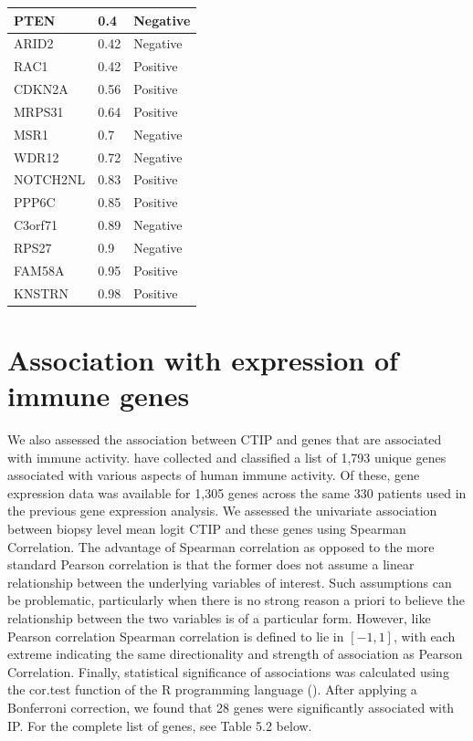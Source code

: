 \documentclass[
]{book}
\begin{document}
\begin{table}
\begin{tabular}[t]{l|l|l}
\hline
PTEN & 0.4 & Negative\\
\hline
ARID2 & 0.42 & Negative\\
\hline
RAC1 & 0.42 & Positive\\
\hline
CDKN2A & 0.56 & Positive\\
\hline
MRPS31 & 0.64 & Positive\\
\hline
MSR1 & 0.7 & Negative\\
\hline
WDR12 & 0.72 & Negative\\
\hline
NOTCH2NL & 0.83 & Positive\\
\hline
PPP6C & 0.85 & Positive\\
\hline
C3orf71 & 0.89 & Negative\\
\hline
RPS27 & 0.9 & Negative\\
\hline
FAM58A & 0.95 & Positive\\
\hline
KNSTRN & 0.98 & Positive\\
\hline
\end{tabular}
\end{table}

\hypertarget{association-with-expression-of-immune-genes}{%
\section{Association with expression of immune genes}\label{association-with-expression-of-immune-genes}}

We also assessed the association between CTIP and genes that are
associated with immune activity. \citet{Bhattacharya18} have collected and classified a list of 1,793 unique genes associated with various aspects of human immune activity. Of these, gene expression data was available for 1,305 genes across the same 330 patients used in the previous gene expression analysis. We assessed the univariate association between biopsy level mean logit CTIP and these genes using Spearman Correlation. The advantage of Spearman correlation as opposed to the more standard Pearson correlation is that the former does not assume a linear relationship between the underlying variables of interest. Such assumptions can be problematic, particularly when there is no strong reason a priori to believe the relationship between the two variables is of a particular form. However, like Pearson correlation Spearman correlation is defined to lie in \([-1,1]\), with each extreme indicating the same directionality and strength of association as Pearson Correlation. Finally, statistical significance of associations was calculated using the cor.test function of the R programming language (\citet{Rteam}). After applying a Bonferroni correction, we found that 28 genes were significantly associated with IP. For the complete list of genes, see Table 5.2 below.
\end{document}
